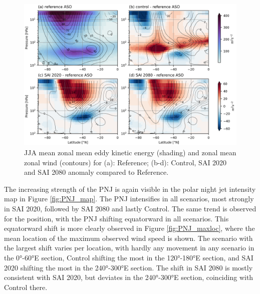 \begin{figure}[H]
	\centering
	\includegraphics[width=0.95\linewidth]{images/PNJ_EKE_U_zmdiff.png}
	\caption{JJA mean zonal mean eddy kinetic energy (shading) and zonal mean zonal wind (contours) for (a): Reference; (b-d): Control, SAI 2020 and SAI 2080 anomaly compared to Reference.}
	\label{fig:PNJ_EKE_U_zmdiff}
\end{figure}

The increasing strength of the PNJ is again visible in the polar night jet intensity map in Figure \ref{fig:PNJ_map}. The PNJ intensifies in all scenarios, most strongly in SAI 2020, followed by SAI 2080 and lastly Control. The same trend is observed for the position, with the PNJ shifting equatorward in all scenarios. This equatorward shift is more clearly observed in Figure \ref{fig:PNJ_maxloc}, where the mean location of the maximum observed wind speed is shown. The scenario with the largest shift varies per location, with hardly any movement in any scenario in the 0°-60°E section, Control shifting the most in the 120°-180°E section, and SAI 2020 shifting the most in the 240°-300°E section. The shift in SAI 2080 is mostly consistent with SAI 2020, but deviates in the 240°-300°E section, coinciding with Control there.

